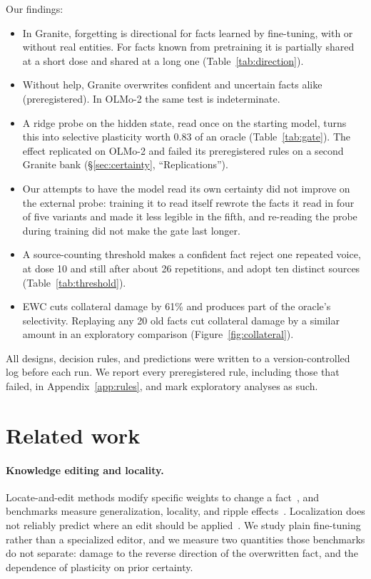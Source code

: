 \documentclass[11pt]{article}
\begin{document}
Our findings:
\begin{itemize}
  \item In Granite, forgetting is directional for facts learned by fine-tuning, with or without real entities. For facts known from pretraining it is partially shared at a short dose and shared at a long one (Table~\ref{tab:direction}).
  \item Without help, Granite overwrites confident and uncertain facts alike (preregistered). In OLMo-2 the same test is indeterminate.
  \item A ridge probe on the hidden state, read once on the starting model, turns this into selective plasticity worth 0.83 of an oracle (Table~\ref{tab:gate}). The effect replicated on OLMo-2 and failed its preregistered rules on a second Granite bank (\S\ref{sec:certainty}, ``Replications'').
  \item Our attempts to have the model read its own certainty did not improve on the external probe: training it to read itself rewrote the facts it read in four of five variants and made it less legible in the fifth, and re-reading the probe during training did not make the gate last longer.
  \item A source-counting threshold makes a confident fact reject one repeated voice, at dose 10 and still after about 26 repetitions, and adopt ten distinct sources (Table~\ref{tab:threshold}).
  \item EWC cuts collateral damage by 61\% and produces part of the oracle's selectivity. Replaying any 20 old facts cut collateral damage by a similar amount in an exploratory comparison (Figure~\ref{fig:collateral}).
\end{itemize}

All designs, decision rules, and predictions were written to a version-controlled log before each run.
We report every preregistered rule, including those that failed, in Appendix~\ref{app:rules}, and mark exploratory analyses as such.

\section{Related work}

\paragraph{Knowledge editing and locality.}
Locate-and-edit methods modify specific weights to change a fact~\citep{meng2022locating,meng2023mass}, and benchmarks measure generalization, locality, and ripple effects~\citep{cohen2024evaluating,yao2023editing,chen2025uniedit}.
Localization does not reliably predict where an edit should be applied~\citep{hase2023localization}.
We study plain fine-tuning rather than a specialized editor, and we measure two quantities those benchmarks do not separate: damage to the reverse direction of the overwritten fact, and the dependence of plasticity on prior certainty.
\end{document}
